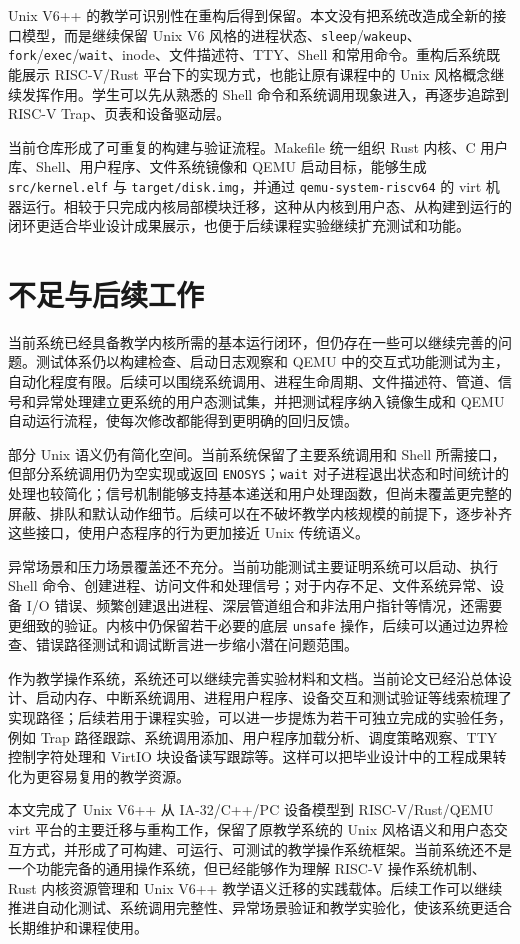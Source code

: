 Unix V6++ 的教学可识别性在重构后得到保留。本文没有把系统改造成全新的接口模型，而是继续保留 Unix V6 风格的进程状态、\verb|sleep|/\verb|wakeup|、\verb|fork|/\verb|exec|/\verb|wait|、inode、文件描述符、TTY、Shell 和常用命令。重构后系统既能展示 RISC-V/Rust 平台下的实现方式，也能让原有课程中的 Unix 风格概念继续发挥作用。学生可以先从熟悉的 Shell 命令和系统调用现象进入，再逐步追踪到 RISC-V Trap、页表和设备驱动层。

当前仓库形成了可重复的构建与验证流程。Makefile 统一组织 Rust 内核、C 用户库、Shell、用户程序、文件系统镜像和 QEMU 启动目标，能够生成 \verb|src/kernel.elf| 与 \verb|target/disk.img|，并通过 \verb|qemu-system-riscv64| 的 virt 机器运行。相较于只完成内核局部模块迁移，这种从内核到用户态、从构建到运行的闭环更适合毕业设计成果展示，也便于后续课程实验继续扩充测试和功能。

\section{不足与后续工作}

当前系统已经具备教学内核所需的基本运行闭环，但仍存在一些可以继续完善的问题。测试体系仍以构建检查、启动日志观察和 QEMU 中的交互式功能测试为主，自动化程度有限。后续可以围绕系统调用、进程生命周期、文件描述符、管道、信号和异常处理建立更系统的用户态测试集，并把测试程序纳入镜像生成和 QEMU 自动运行流程，使每次修改都能得到更明确的回归反馈。

部分 Unix 语义仍有简化空间。当前系统保留了主要系统调用和 Shell 所需接口，但部分系统调用仍为空实现或返回 \verb|ENOSYS|；\verb|wait| 对子进程退出状态和时间统计的处理也较简化；信号机制能够支持基本递送和用户处理函数，但尚未覆盖更完整的屏蔽、排队和默认动作细节。后续可以在不破坏教学内核规模的前提下，逐步补齐这些接口，使用户态程序的行为更加接近 Unix 传统语义。

异常场景和压力场景覆盖还不充分。当前功能测试主要证明系统可以启动、执行 Shell 命令、创建进程、访问文件和处理信号；对于内存不足、文件系统异常、设备 I/O 错误、频繁创建退出进程、深层管道组合和非法用户指针等情况，还需要更细致的验证。内核中仍保留若干必要的底层 \verb|unsafe| 操作，后续可以通过边界检查、错误路径测试和调试断言进一步缩小潜在问题范围。

作为教学操作系统，系统还可以继续完善实验材料和文档。当前论文已经沿总体设计、启动内存、中断系统调用、进程用户程序、设备交互和测试验证等线索梳理了实现路径；后续若用于课程实验，可以进一步提炼为若干可独立完成的实验任务，例如 Trap 路径跟踪、系统调用添加、用户程序加载分析、调度策略观察、TTY 控制字符处理和 VirtIO 块设备读写跟踪等。这样可以把毕业设计中的工程成果转化为更容易复用的教学资源。

本文完成了 Unix V6++ 从 IA-32/C++/PC 设备模型到 RISC-V/Rust/QEMU virt 平台的主要迁移与重构工作，保留了原教学系统的 Unix 风格语义和用户态交互方式，并形成了可构建、可运行、可测试的教学操作系统框架。当前系统还不是一个功能完备的通用操作系统，但已经能够作为理解 RISC-V 操作系统机制、Rust 内核资源管理和 Unix V6++ 教学语义迁移的实践载体。后续工作可以继续推进自动化测试、系统调用完整性、异常场景验证和教学实验化，使该系统更适合长期维护和课程使用。

